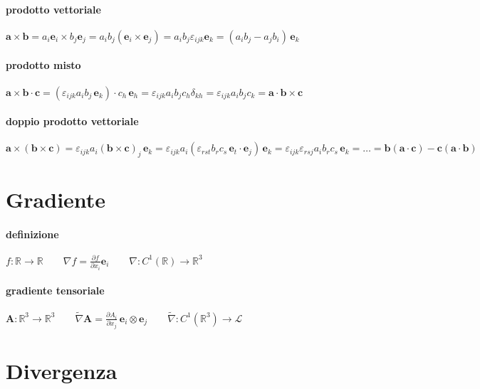 \documentclass[10pt,a4paper]{article}
\newcommand{\fracp}[2]{\frac{\partial #1}{\partial #2}}
\begin{document}
\paragraph{prodotto vettoriale}
$\mathbf a \times \mathbf b = a_i \mathbf e_i \times b_j \mathbf e_j = a_i b_j (\mathbf e_i \times \mathbf e_j) = a_i b_j \varepsilon_{ijk} \mathbf e_k = (a_i b_j -a_j b_i)\, \mathbf e_k$

\paragraph{prodotto misto}
$\mathbf a \times \mathbf b \cdot \mathbf c = (\varepsilon_{ijk} a_i b_j\, \mathbf e_k) \cdot c_h\, \mathbf e_h = \varepsilon_{ijk} a_i b_j c_h \delta_{kh} = \varepsilon_{ijk} a_i b_j c_k = \mathbf a \cdot \mathbf b \times \mathbf c$

\paragraph{doppio prodotto vettoriale}
$\mathbf a \times (\mathbf b \times \mathbf c) = \varepsilon_{ijk} a_i (\mathbf b \times \mathbf c)_j\, \mathbf e_k = \varepsilon_{ijk} a_i (\varepsilon_{rst} b_r c_s\, \mathbf e_t \cdot \mathbf e_j)\, \mathbf e_k = \varepsilon_{ijk} \varepsilon_{rsj} a_i b_r c_s\, \mathbf e_k = \ldots = \mathbf b(\mathbf a \cdot \mathbf c) - \mathbf c(\mathbf a \cdot \mathbf b)$



	\section{Gradiente}
\paragraph{definizione}
$f: \mathbb{R} \longrightarrow \mathbb{R} \qquad \nabla f = \fracp{f}{x_i} \mathbf e_i \qquad \nabla: C^1(\mathbb{R}) \longrightarrow \mathbb{R}^3$
	
\paragraph{gradiente tensoriale}
\quad$\mathbf A: \mathbb{R}^3 \longrightarrow \mathbb{R}^3 \qquad \tilde\nabla \mathbf A=\fracp{A_i}{x_j}\, \mathbf e_i \otimes \mathbf e_j \qquad \tilde\nabla: C^1(\mathbb{R}^3) \longrightarrow \mathscr L$



	\section{Divergenza}
\end{document}
